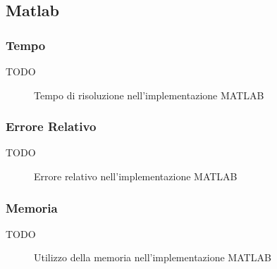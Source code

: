 \documentclass[11pt,italian]{article}
\begin{document}
\subsection{Matlab}
\subsubsection*{Tempo}
TODO
\begin{figure}[H]
    \caption{Tempo di risoluzione nell'implementazione MATLAB}
    \label{fig:matlab-time}
\end{figure}

\subsubsection*{Errore Relativo}
TODO
\begin{figure}[H]
    \caption{Errore relativo nell'implementazione MATLAB}
    \label{fig:matlab-error}
\end{figure}

\subsubsection*{Memoria}
TODO
\begin{figure}[H]
    \caption{Utilizzo della memoria nell'implementazione MATLAB}
    \label{fig:matlab-memory}
\end{figure}
\end{document}
